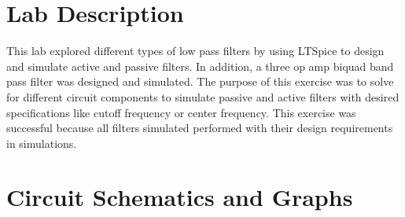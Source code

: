 \documentclass[CMPE]{KGCOEReport}
\begin{document}
\maketitle

%

\section*{Lab Description}
This lab explored different types of low pass filters by using LTSpice to design and simulate active and passive filters. In addition, a three op amp biquad band pass filter was designed and simulated. The purpose of this exercise was to solve for different circuit components to simulate passive and active filters with desired specifications like cutoff frequency or center frequency. This exercise was successful because all filters simulated performed with their design requirements in simulations. 

\section*{Circuit Schematics and Graphs}
\end{document}

